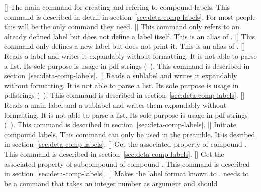 \documentclass[load-preamble+,babel-options={ngerman,british,american}]{cnltx-doc}
\begin{document}
\begin{commands}
  [\sarg\code{+}]
    The main command for creating and refering to compound labels.  This
    command is described in detail in section~\ref{sec:deta-comp-labels}.  For
    most people this will be the only command they need.
  []
    This command only refers to an already defined label but does not define a
    label itself.  This is an alias of \code{+}.
  []
    This command only defines a new label but does not print it.  This is an
    alias of \sarg.
  \expandable{}[]
    Reads a label and writes it expandably without formatting.  It is not able
    to parse a list.  Its sole purpose is usage in \ac{pdf} strings
    (\cf\ \marg{\TeX}).  This
    command is described in section~\ref{sec:deta-comp-labels}.
  \expandable{}[]
    Reads a sublabel and writes it expandably without formatting.  It is not
    able to parse a list.  Its sole purpose is usage in pdfstrings
    (\cf\ \marg{\TeX}).  This
    command is described in section~\ref{sec:deta-comp-labels}.
  \expandable{}[]
    Reads a main label and a sublabel and writes them expandably without
    formatting.  It is not able to parse a list.  Its sole purpose is usage in
    \ac{pdf} strings (\cf\ \marg{\TeX}). This command is described in
    section~\ref{sec:deta-comp-labels}.
  []
    Initiate compound labels.  This command can only be used in the preamble.
    It is desribed in section~\ref{sec:deta-comp-labels}.
  \expandable{}[]
    Get the associated property  of compound
    . This command is described in
    section~\ref{sec:deta-comp-labels}.
  \expandable{}[]
    Get the associated property  of subcompound  of compound .  This command is described
    in section~\ref{sec:deta-comp-labels}.
  []
    Makes the label format  known to \chemnum.  
    needs to be a command that takes an integer number as argument and should

\end{commands}
\end{document}
